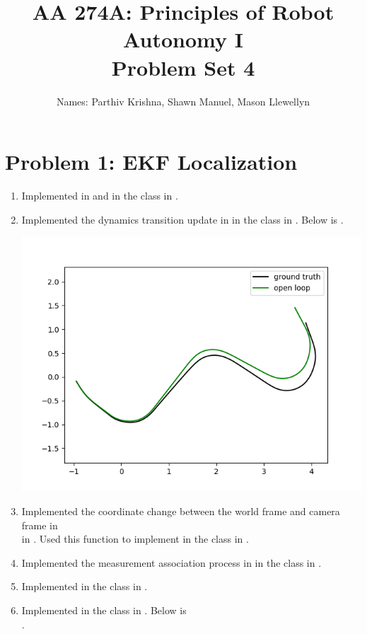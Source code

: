 \documentclass{article}
\title{AA 274A: Principles of Robot Autonomy I \\ Problem Set 4}
\author{Names: Parthiv Krishna, Shawn Manuel, Mason Llewellyn}
\date{}
\begin{document}
\maketitle
\pagestyle{fancy} 

\section*{Problem 1: EKF Localization}
\begin{enumerate}[label=(\roman*)]
\item Implemented  in  and  in the  class in .
\item Implemented the dynamics transition update in  in the  class in . Below is .

\includegraphics[width=\textwidth]{ekf_open_loop.png}

\item Implemented the coordinate change between the world frame and camera frame in \\  in . Used this function to implement  in the  class in .
\item Implemented the measurement association process in  in the  class in .
\item Implemented  in the  class in .
\item Implemented  in the  class in . Below is \\ . 


\end{enumerate}
\end{document}

